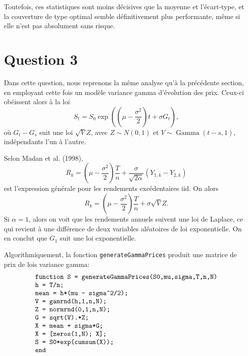 \documentclass[12pt,fleqn]{article}
\DeclareMathOperator{\gam}{Gamma}
\begin{document}
Toutefois, ces statistiques sont moins décisives que la moyenne et l’écart-type, et la
couverture de type optimal semble définitivement plus performante, même si elle n’est pas
absolument sans risque. 


\section*{Question 3}

Dans cette question, nous reprenons la même analyse qu'à la précédente section, en
employant cette fois un modèle variance gamma d'évolution des prix. Ceux-ci obéissent
alors à la loi
\begin{equation*}
  S_t = S_0\exp\left(\left(\mu - \frac{\sigma^2}{2}\right)t + \sigma G_t\right),
\end{equation*}
où $G_t-G_s$ suit une loi $\sqrt{V}Z$, avec $Z\sim N(0,1)$ et $V\sim\gam(t-s,1)$,
indépendants l'un à l'autre. 

Selon Madan et al. (1998), 
\begin{equation*}
  R_k = \left(\mu - \frac{\sigma^2}{2}\right) \frac{T}{n} +
  \frac{\sigma}{\sqrt{2\alpha}}(Y_{1,k} - Y_{2,k})
\end{equation*}
est l'expression générale pour les rendements excédentaires iid. On alors
\begin{equation*}
  R_k = \left(\mu - \frac{\sigma^2}{2}\right)\frac{T}{n} + \sigma\sqrt{V}Z.
\end{equation*}
Si $\alpha=1$, alors on voit que les rendements annuels suivent une loi de Laplace, ce qui
revient à une différence de deux variables aléatoires de loi exponentielle. On en conclut
que $G_1$ suit une loi exponentielle. 

Algorithmiquement, la fonction \verb+generateGammaPrices+ produit une matrice de prix de
lois variance gamma:
\begin{equation*}
  \left.
    \begin{array}{l}
      \verb|function S = generateGammaPrices(S0,mu,sigma,T,n,N)|\\
      \verb|h = T/n;|\\
      \verb|mean = h*(mu - sigma^2/2);|\\
      \verb|V = gamrnd(h,1,n,N);|\\
      \verb|Z = normrnd(0,1,n,N);|\\
      \verb|G = sqrt(V).*Z;|\\
      \verb|X = mean + sigma*G;|\\
      \verb|X = [zeros(1,N); X];|\\
      \verb|S = S0*exp(cumsum(X));|\\
      \verb|end|\\
    \end{array}
  \right.
\end{equation*}
\end{document}
